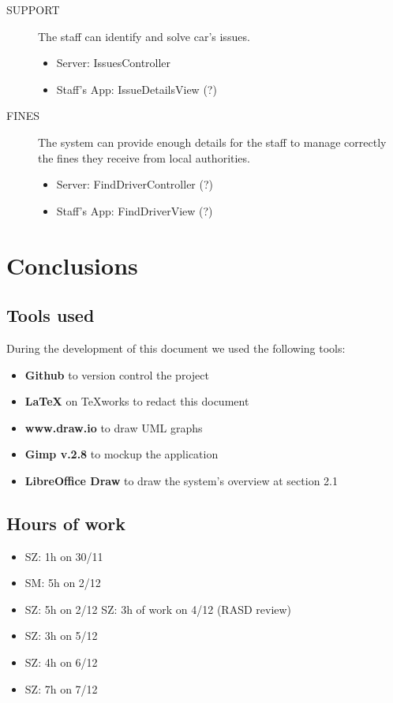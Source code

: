 \documentclass[11pt]{article} %
\begin{document}
\begin{description}
	\item[SUPPORT] The staff can identify and solve car's issues.
	\begin{itemize}
		\item Server: IssuesController
		\item Staff's App: IssueDetailsView (?)
	\end{itemize}

	\item[FINES] The system can provide enough details for the staff to manage correctly the fines they receive from local authorities.
	\begin{itemize}
		\item Server: FindDriverController (?)
		\item Staff's App: FindDriverView (?)
	\end{itemize}

 \end{description}


\newpage
\section{Conclusions}

\subsection{Tools used}
During the development of this document we used the following tools:
\begin{itemize}
	\item \textbf{Github} to version control the project
	\item \textbf{\LaTeX} on TeXworks to redact this document
	\item \textbf{www.draw.io} to draw UML graphs
	\item \textbf{Gimp v.2.8} to mockup the application
	\item \textbf{LibreOffice Draw} to draw the system's overview at section 2.1
\end{itemize}

\subsection{Hours of work}
\begin{itemize}
	\item SZ: 1h on 30/11
	\item SM: 5h on 2/12
	\item SZ: 5h on 2/12
	SZ: 3h of work on 4/12 (RASD review)

	\item SZ: 3h on 5/12
	\item SZ: 4h on 6/12
	\item SZ: 7h on 7/12
\end{itemize}
\end{document}
